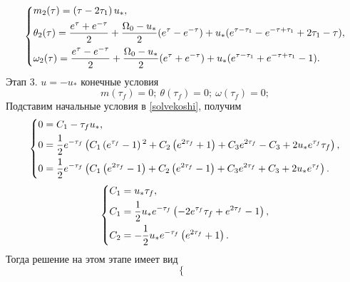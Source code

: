 \documentclass[a4paper,14pt]{article}
\theoremstyle{plain} %
\theoremstyle{definition} %
\theoremstyle{remark} %
\begin{document}
{\[
    \left\{ {\begin{aligned}
                 & m_2(\tau) = \left(\tau -2 \tau _1\right) u_*, \hfill                                                                                                \\
                 & \theta_2(\tau) = \frac{e^\tau+e^{-\tau}}{2}+\frac{\Omega_0-u_\ast}{2}(e^\tau-e^{-\tau})+u_*(e^{\tau-\tau_1}-e^{-\tau+\tau_1}+2\tau_1-\tau) , \hfill \\
                 & \omega_2(\tau) = \frac{e^\tau-e^{-\tau}}{2}+\frac{\Omega_0-u_\ast}{2}(e^\tau+e^{-\tau})+u_*(e^{\tau-\tau_1}+e^{-\tau+\tau_1}-1) . \hfill            \\
            \end{aligned}} \right.
\]
Этап 3. $u=-u_*$ конечные условия
\[
    m(\tau_f)=0; \ \theta(\tau_f)=0;\ \omega(\tau_f)=0;
\]
Подставим начальные условия в \eqref{solvekoshi}, получим
\[
    \left\{ {\begin{aligned}
                 & 0 = C_1-\tau_f  u_*, \hfill                                               \\
                 & 0 = \frac{1}{2} e^{-\tau _f} \left(C_1 \left(e^{\tau _f}-1\right){}^2+C_2
                \left(e^{2 \tau _f}+1\right)+C_3 e^{2 \tau _f}-C_3+2 u_* e^{\tau _f} \tau
                _f\right), \hfill                                                            \\
                 & 0 = \frac{1}{2} e^{-\tau _f} \left(C_1 \left(e^{2 \tau _f}-1\right)+C_2
                \left(e^{2 \tau _f}-1\right)+C_3 e^{2 \tau _f}+C_3+2 u_* e^{\tau
                _f}\right)  . \hfill                                                         \\
            \end{aligned}} \right.
\]
\[
    \left\{ {\begin{aligned}
                 & C_1 = u_* \tau _f, \hfill                                                  \\
                 & C_1 = \frac{1}{2} u_* e^{-\tau _f} \left(-2 e^{\tau _f} \tau _f+e^{2 \tau
                _f}-1\right), \hfill                                                          \\
                 & C_2 = -\frac{1}{2} u_* e^{-\tau _f} \left(e^{2 \tau _f}+1\right)  . \hfill \\
            \end{aligned}} \right.
\]
Тогда решение на этом этапе имеет вид
\[
    \left\{ {\begin{aligned}

\end{aligned}}\]}
\end{document}
